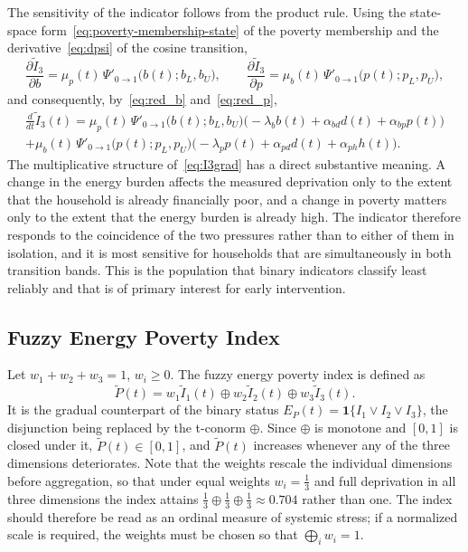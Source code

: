 \documentclass[11pt,a4paper]{article}
\begin{document}
The sensitivity of the indicator follows from the product rule. Using the state-space form~\eqref{eq:poverty-membership-state} of the poverty membership and the derivative~\eqref{eq:dpsi} of the cosine transition,
\begin{equation}\label{eq:I3grad}
\frac{\partial\widetilde I_3}{\partial b}
=
\mu_p(t)\,\Psi'_{0\to1}\bigl(b(t);b_L,b_U\bigr),
\qquad
\frac{\partial\widetilde I_3}{\partial p}
=
\mu_b(t)\,\Psi'_{0\to1}\bigl(p(t);p_L,p_U\bigr),
\end{equation}
and consequently, by~\eqref{eq:red_b} and~\eqref{eq:red_p},
\begin{multline}\label{eq:I3dot}
\frac{d}{dt}\widetilde I_3(t)
=
\mu_p(t)\,\Psi'_{0\to1}\bigl(b(t);b_L,b_U\bigr)
\bigl(-\lambda_b b(t)+\alpha_{bd}d(t)+\alpha_{bp}p(t)\bigr)\\
+
\mu_b(t)\,\Psi'_{0\to1}\bigl(p(t);p_L,p_U\bigr)
\bigl(-\lambda_p p(t)+\alpha_{pd}d(t)+\alpha_{ph}h(t)\bigr).
\end{multline}
The multiplicative structure of~\eqref{eq:I3grad} has a direct substantive meaning. A change in the energy burden affects the measured deprivation only to the extent that the household is already financially poor, and a change in poverty matters only to the extent that the energy burden is already high. The indicator therefore responds to the coincidence of the two pressures rather than to either of them in isolation, and it is most sensitive for households that are simultaneously in both transition bands. This is the population that binary indicators classify least reliably and that is of primary interest for early intervention.

\subsection{Fuzzy Energy Poverty Index}

Let $w_1+w_2+w_3=1$, $w_i\ge0$. The fuzzy energy poverty index is defined as
\begin{equation}\label{eq:fuzzy-index}
\tilde P(t)=
w_1\tilde I_1(t)\oplus
w_2\tilde I_2(t)\oplus
w_3\tilde I_3(t).
\end{equation}
It is the gradual counterpart of the binary status $E_P(t)=\mathbf{1}\{I_1\lor I_2\lor I_3\}$, the disjunction being replaced by the t-conorm $\oplus$. Since $\oplus$ is monotone and $[0,1]$ is closed under it, $\tilde P(t)\in[0,1]$, and $\tilde P(t)$ increases whenever any of the three dimensions deteriorates. Note that the weights rescale the individual dimensions before aggregation, so that under equal weights $w_i=\tfrac13$ and full deprivation in all three dimensions the index attains $\tfrac13\oplus\tfrac13\oplus\tfrac13\approx0.704$ rather than one. The index should therefore be read as an ordinal measure of systemic stress; if a normalized scale is required, the weights must be chosen so that $\bigoplus_i w_i=1$.
\end{document}
